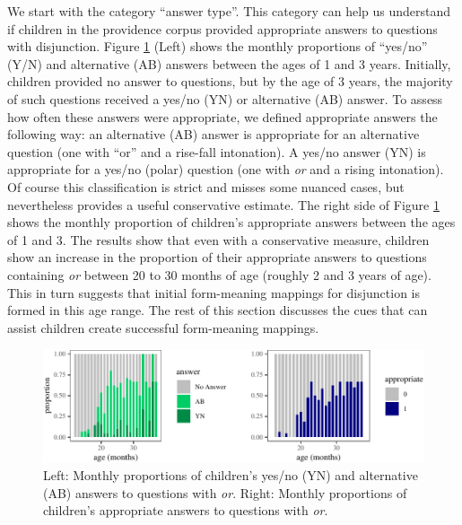 \documentclass[,man,floatsintext]{apa6}
\begin{document}
We start with the category \enquote{answer type}. This category can help us understand if children in the providence corpus provided appropriate answers to questions with disjunction. Figure \ref{fig:answerPlot} (Left) shows the monthly proportions of \enquote{yes/no} (Y/N) and alternative (AB) answers between the ages of 1 and 3 years. Initially, children provided no answer to questions, but by the age of 3 years, the majority of such questions received a yes/no (YN) or alternative (AB) answer. To assess how often these answers were appropriate, we defined appropriate answers the following way: an alternative (AB) answer is appropriate for an alternative question (one with \enquote{or} and a rise-fall intonation). A yes/no answer (YN) is appropriate for a yes/no (polar) question (one with \emph{or} and a rising intonation). Of course this classification is strict and misses some nuanced cases, but nevertheless provides a useful conservative estimate. The right side of Figure \ref{fig:answerPlot} shows the monthly proportion of children's appropriate answers between the ages of 1 and 3. The results show that even with a conservative measure, children show an increase in the proportion of their appropriate answers to questions containing \emph{or} between 20 to 30 months of age (roughly 2 and 3 years of age). This in turn suggests that initial form-meaning mappings for disjunction is formed in this age range. The rest of this section discusses the cues that can assist children create successful form-meaning mappings.

\begin{figure}[tb]

{\centering \includegraphics{figs/answerPlot-1} 

}

\caption{Left: Monthly proportions of children's yes/no (YN) and alternative (AB) answers to questions with \textit{or}. Right: Monthly proportions of children's appropriate answers to questions with \textit{or}.}\label{fig:answerPlot}
\end{figure}
\end{document}
